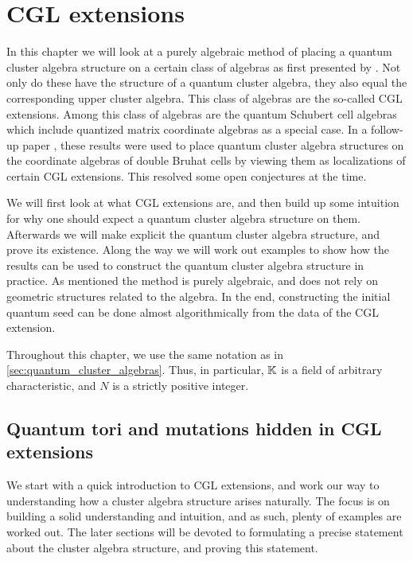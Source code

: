 \chapter{CGL extensions}\label{sec:cgl_extensions}
\chaptertoc

\noindent
In this chapter we will look at a purely algebraic method of placing a quantum cluster
algebra structure on a certain class of algebras as first presented by
\textcite{GoodearlYakimov2017QCA}. Not only do these have the structure of a quantum
cluster algebra, they also equal the corresponding upper cluster algebra. This class of
algebras are the so-called CGL extensions. Among this class of algebras are the quantum
Schubert cell algebras which include quantized matrix coordinate algebras as a special
case. In a follow-up paper \cite{GoodearlYakimov2020BerensteinZelivinskyQCAC}, these
results were used to place quantum cluster algebra structures on the coordinate
algebras of double Bruhat cells by viewing them as localizations of certain CGL
extensions. This resolved some open conjectures at the time.

We will first look at what CGL extensions are, and then build up some intuition for why
one should expect a quantum cluster algebra structure on them. Afterwards we will make
explicit the quantum cluster algebra structure, and prove its existence. Along the way
we will work out examples to show how the results can be used to construct the quantum
cluster algebra structure in practice. As mentioned the method is purely algebraic, and
does not rely on geometric structures related to the algebra. In the end, constructing
the initial quantum seed can be done almost algorithmically from the data of the CGL
extension.

Throughout this chapter, we use the same notation as in
\cref{sec:quantum_cluster_algebras}. Thus, in particular, $\mathbb{K}$ is a field of
arbitrary characteristic, and $N$ is a strictly positive integer.

\section{Quantum tori and mutations hidden in CGL extensions}\label{sec:cgl_introduction}

We start with a quick introduction to CGL extensions, and work our way to understanding
how a cluster algebra structure arises naturally. The focus is on building a solid
understanding and intuition, and as such, plenty of examples are worked out. The later
sections will be devoted to formulating a precise statement about the cluster algebra
structure, and proving this statement.


